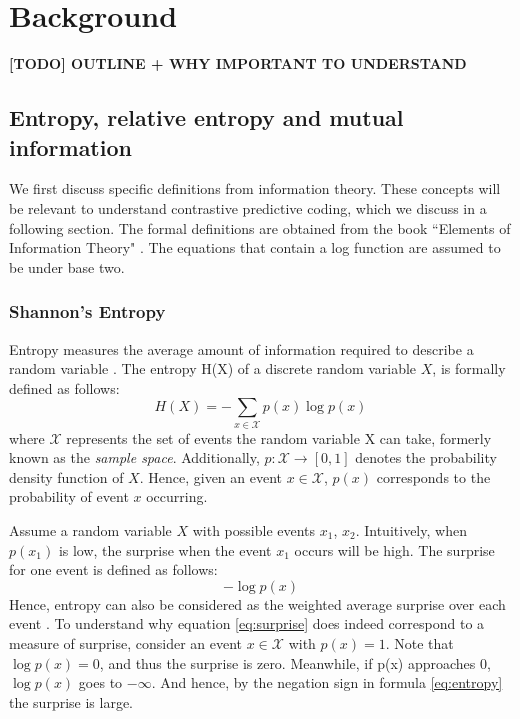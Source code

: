 
\chapter{Background}

\textbf{[TODO] OUTLINE + WHY IMPORTANT TO UNDERSTAND}

\section{Entropy, relative entropy and mutual information}
We first discuss specific definitions from information theory. These concepts will be relevant to understand contrastive predictive coding, which we discuss in a following section. The formal definitions are obtained from the book ``Elements of Information Theory" \citep{coverElementsInformationTheory2006}. The equations that contain a log function are assumed to be under base two.
\subsection{Shannon's Entropy}
Entropy measures the average amount of information required to describe a random variable \citep{coverElementsInformationTheory2006}. The entropy H(X) of a discrete random variable $X$, is formally defined as follows: 
\begin{equation}
	H(X) = -\sum_{x\in\mathcal{X}} p(x) \log p(x)  \label{eq:entropy}
\end{equation}
where $\mathcal{X}$ represents the set of events the random variable X can take, formerly known as the \textit{sample space}. Additionally, $p: \mathcal{X} \rightarrow [0, 1]$ denotes the probability density function of $X$. Hence, given an event $ x \in \mathcal{X}$, $p(x)$ corresponds to the probability of event $x$ occurring.

Assume a random variable $X$ with possible events $x_1$, $x_2$. Intuitively, when $p(x_1)$ is low, the surprise when the event $x_1$ occurs will be high. The surprise for one event is defined as follows:
\begin{equation}
	- \log p(x) \label{eq:surprise}
\end{equation}
Hence, entropy can also be considered as the weighted average surprise over each event \citep{datasciencecoursesAliGhodsiLec2017}. 
To understand why equation \ref{eq:surprise} does indeed correspond to a measure of surprise, consider an event $x \in \mathcal{X}$ with $p(x) = 1$. Note that $\log p(x) = 0$, and thus the surprise is zero. Meanwhile, if p(x) approaches $0$, $\log p(x)$ goes to $- \infty$. And hence, by the negation sign in formula \ref{eq:entropy} the surprise is large.


